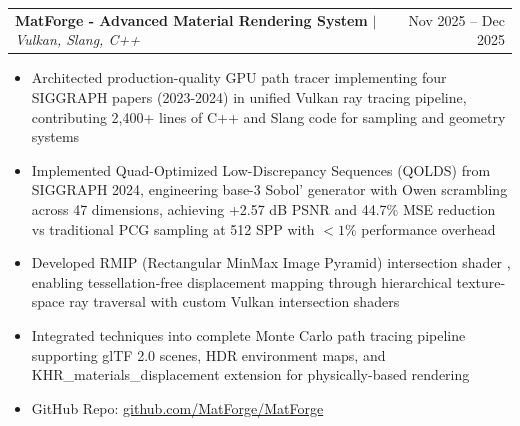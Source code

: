 \documentclass[letterpaper,11pt]{article}
\makeatletter
\newcommand{\resumeItem}[1]{
  \item\small{
    {#1 \vspace{-3pt}}
  }
}
\newcommand{\resumeProjectHeading}[2]{
    \item
    \begin{tabular*}{0.97\textwidth}{l@{\extracolsep{\fill}}r}
      \small#1 & #2 \\
    \end{tabular*}\vspace{-7pt}
}
\newcommand{\resumeItemListStart}{\begin{itemize}}
\newcommand{\resumeItemListEnd}{\end{itemize}\vspace{-5pt}}
\makeatother
\begin{document}
\resumeProjectHeading
      {\textbf{MatForge - Advanced Material Rendering System} $|$ \emph{Vulkan, Slang, C++}}{Nov 2025 -- Dec 2025}
      \resumeItemListStart
      \resumeItem{Architected production-quality GPU path tracer implementing four SIGGRAPH papers (2023-2024) in unified Vulkan ray tracing pipeline, contributing 2,400+ lines of C++ and Slang code for sampling and geometry systems}
      \resumeItem{Implemented Quad-Optimized Low-Discrepancy Sequences (QOLDS) from SIGGRAPH 2024, engineering base-3 Sobol' generator with Owen scrambling across 47 dimensions, achieving +2.57 dB PSNR and 44.7\% MSE reduction vs traditional PCG sampling at 512 SPP with $<1\%$ performance overhead}
      \resumeItem{Developed RMIP (Rectangular MinMax Image Pyramid) intersection shader , enabling tessellation-free displacement mapping through hierarchical texture-space ray traversal with custom Vulkan intersection shaders}
      \resumeItem{Integrated techniques into complete Monte Carlo path tracing pipeline supporting glTF 2.0 scenes, HDR environment maps, and KHR\_materials\_displacement extension for physically-based rendering}
      \resumeItem{GitHub Repo: \href{https://github.com/MatForge/MatForge}{\uline{github.com/MatForge/MatForge}}}
      \resumeItemListEnd

\end{document}
